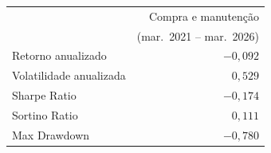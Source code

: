 \begin{tabular}{lr}
\toprule
 & Compra e manutenção \\
 & (mar.\ 2021 -- mar.\ 2026) \\
\midrule
Retorno anualizado & $-0{,}092$ \\
Volatilidade anualizada & $0{,}529$ \\
Sharpe Ratio & $-0{,}174$ \\
Sortino Ratio & $0{,}111$ \\
Max Drawdown & $-0{,}780$ \\
\bottomrule
\end{tabular}
